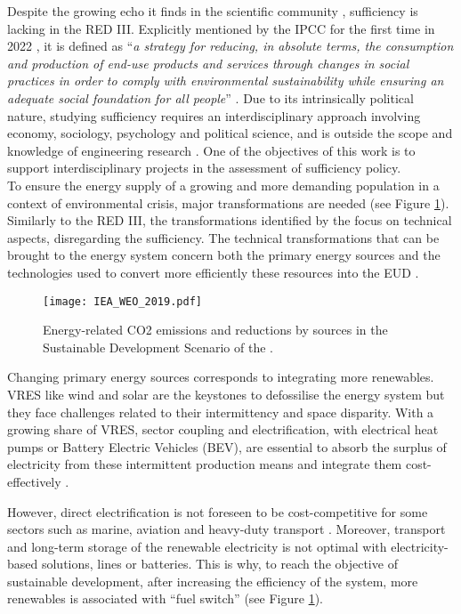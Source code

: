 Despite the growing echo it finds in the scientific community \cite{o2018good}, sufficiency is lacking in the RED III. Explicitly mentioned by the IPCC for the first time in 2022 \cite{IPCC2022}, it is defined as ``\emph{a strategy for reducing, in absolute terms, the consumption and production of end-use products and services through changes in social practices in order to comply with environmental sustainability while ensuring an adequate social foundation for all people}'' \cite{lage2023citizens}. Due to its intrinsically political nature, studying sufficiency requires an interdisciplinary approach involving economy, sociology, psychology and political science, and is outside the scope and knowledge of engineering research \cite{schmidt2015interdisciplinary}. One of the objectives of this work is to support interdisciplinary projects in the assessment of sufficiency policy. \\

\noindent
To ensure the energy supply of a growing and more demanding population in a context of environmental crisis, major transformations are needed (see Figure \ref{fig:intro:IEA_WEO_2019}). Similarly to the RED III, the transformations identified by the \citet{iea2020world} focus on technical aspects, disregarding the sufficiency.  The technical transformations that can be brought to the energy system concern both the primary energy sources and the technologies used to convert more efficiently these resources into the \gls{EUD} \cite{iea2020world,luderer2018residual}. 

\begin{figure}[ht!]
\centering
\texttt{[image: IEA\_WEO\_2019.pdf]}
\caption{Energy-related CO2 emissions and reductions by sources in the Sustainable Development Scenario of the \citet{iea2020world}.}
\label{fig:intro:IEA_WEO_2019}
\end{figure}

Changing primary energy sources corresponds to integrating more renewables. \gls{VRES} like wind and solar are the keystones to defossilise the energy system but they face challenges related to their intermittency and space disparity.  With a growing share of \gls{VRES}, sector coupling and electrification, with electrical heat pumps or Battery Electric Vehicles (BEV), are essential to absorb the surplus of electricity from these intermittent production means \cite{robinius2017linking} and integrate them cost-effectively \cite{brown2018response, limpensECOS2021}. 

However, direct electrification is not foreseen to be cost-competitive for some sectors such as marine, aviation and heavy-duty transport \cite{horvath2018techno, brynolf2018,IEA2021}. Moreover, transport and long-term storage of the renewable electricity is not optimal with electricity-based solutions,  lines or batteries. This is why, to reach the objective of sustainable development, after increasing the efficiency of the system, more renewables is associated with ``fuel switch'' (see Figure \ref{fig:intro:IEA_WEO_2019}). 

